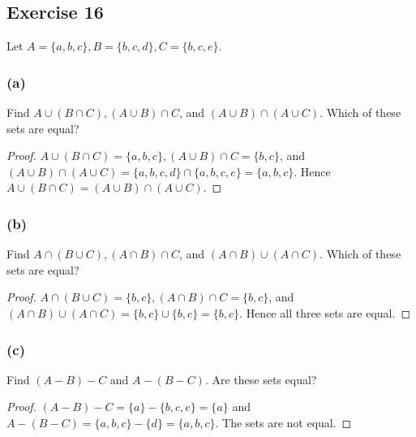 \documentclass[14pt]{extarticle}
\begin{document}
\subsection{Exercise 16}
Let \(A = \{a, b, c\}, B = \{b, c, d\}, C = \{b, c, e\}\).

\subsubsection{(a)}
Find \(A \cup (B \cap C), (A \cup B) \cap C\), and \((A \cup B) \cap (A \cup C)\). Which of these sets are equal?

\begin{proof}
\(A \cup (B \cap C ) = \{a, b, c\}, (A \cup B) \cap C =
\{b, c\}\), 
and \((A \cup B) \cap (A \cup C ) = \{a, b, c, d\} \cap \{a, b, c, e\} = \{a, b, c\}\). 
Hence \(A \cup (B \cap C ) = (A \cup B) \cap (A \cup C).\)
\end{proof}

\subsubsection{(b)}
Find \(A \cap (B \cup C), (A \cap B) \cap C\), and \((A \cap B) \cup (A \cap C)\). Which of these sets are equal?

\begin{proof}
\(A \cap (B \cup C ) = \{b, c\}, (A \cap B) \cap C =
\{b, c\}\), 
and \((A \cap B) \cup (A \cap C ) = \{b, c\} \cup \{b, c\} = \{b, c\}\). 
Hence all three sets are equal.
\end{proof}

\subsubsection{(c)}
Find \((A - B) - C\) and \(A - (B - C)\). Are these sets equal?

\begin{proof}
\((A - B) - C = \{a\} - \{b, c, e\} = \{a\}\) and \(A - (B - C) = \{a, b, c\} - \{d\} = \{a, b, c\}\).
The sets are not equal.
\end{proof}
\end{document}
